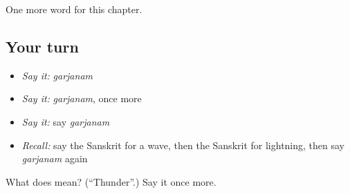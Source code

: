 \begin{grammarlens}[title={What you've built}]
One more word for this chapter.
\end{grammarlens}

\subsection*{Your turn}
\begin{itemize}
\raggedright
  \item \emph{Say it:} \emph{garjanam}
  \item \emph{Say it:} \emph{garjanam}, once more
  \item \emph{Say it:} say \emph{garjanam}
  \item \emph{Recall:} say the Sanskrit for a wave, then the Sanskrit for lightning, then say \emph{garjanam} again
\end{itemize}

\begin{tcolorbox}[breakable,colback=teal!4,colframe=teal!35!black,title={Before you move on}]
What does  mean? (\textquotedblleft{}Thunder\textquotedblright{}.) Say it once more.
\end{tcolorbox}
